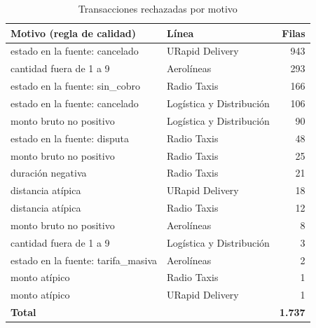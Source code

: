 \begin{table}[!htbp]
  \centering
  \caption{Transacciones rechazadas por motivo}
  \label{tab:est_rechazos}
  \small
  \begin{tabularx}{\linewidth}{@{}>{\raggedright\arraybackslash}Xlr@{}}
    \toprule
    \textbf{Motivo (regla de calidad)} & \textbf{Línea} & \textbf{Filas} \\
    \midrule
    estado en la fuente: cancelado & URapid Delivery & 943 \\
    cantidad fuera de 1 a 9 & Aerolíneas & 293 \\
    estado en la fuente: sin\_cobro & Radio Taxis & 166 \\
    estado en la fuente: cancelado & Logística y Distribución & 106 \\
    monto bruto no positivo & Logística y Distribución & 90 \\
    estado en la fuente: disputa & Radio Taxis & 48 \\
    monto bruto no positivo & Radio Taxis & 25 \\
    duración negativa & Radio Taxis & 21 \\
    distancia atípica & URapid Delivery & 18 \\
    distancia atípica & Radio Taxis & 12 \\
    monto bruto no positivo & Aerolíneas & 8 \\
    cantidad fuera de 1 a 9 & Logística y Distribución & 3 \\
    estado en la fuente: tarifa\_masiva & Aerolíneas & 2 \\
    monto atípico & Radio Taxis & 1 \\
    monto atípico & URapid Delivery & 1 \\
    \midrule
    \textbf{Total} &  & \textbf{1.737} \\
    \bottomrule
  \end{tabularx}
\end{table}
